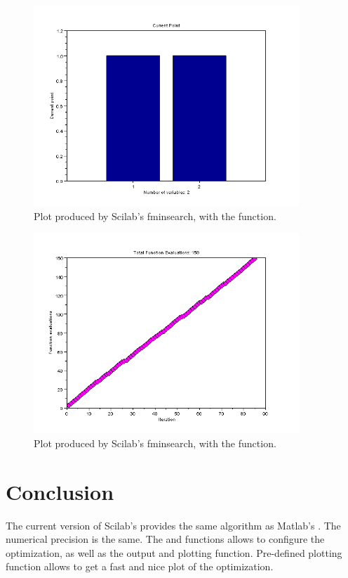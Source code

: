 \begin{figure}
\begin{center}
\includegraphics[width=10cm]{fminsearch/testFminsearchOptimplotxScilab.png}
\end{center}
\caption{Plot produced by Scilab's fminsearch, with the  function.}
\label{fig-fminsearch-scilab-optimplotx}
\end{figure}

\begin{figure}
\begin{center}
\includegraphics[width=10cm]{fminsearch/testFminsearchOptimplotfunccountScilab.png}
\end{center}
\caption{Plot produced by Scilab's fminsearch, with the  function.}
\label{fig-fminsearch-scilab-optimplotfunccount}
\end{figure}

\section{Conclusion}

The current version of Scilab's  provides the same algorithm
as Matlab's . The numerical precision is the same.
The  and  functions allows to configure the optimization, 
as well as the output and plotting function.
Pre-defined plotting function allows to get a fast and nice plot of the optimization.


